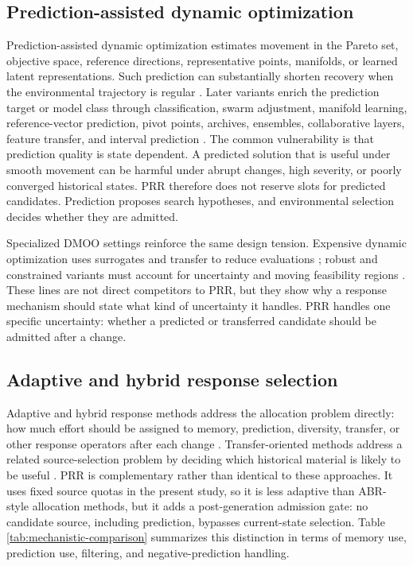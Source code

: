 \documentclass[1p,times]{elsarticle}
\begin{document}
\subsection{Prediction-assisted dynamic optimization}
Prediction-assisted dynamic optimization estimates movement in the Pareto set, objective space, reference directions, representative points, manifolds, or learned latent representations. Such prediction can substantially shorten recovery when the environmental trajectory is regular \cite{zhou2014,grey2020,objective2021,hybrid2022mutation}. Later variants enrich the prediction target or model class through classification, swarm adjustment, manifold learning, reference-vector prediction, pivot points, archives, ensembles, collaborative layers, feature transfer, and interval prediction \cite{classification2022,particle2022pspas,manifold2023mcp,zheng2023rvcp,pivot2023hppds,wang2024dmpa,ensemble2024,hu2025dlcp,ruan2026feature,ou2026hcips}. The common vulnerability is that prediction quality is state dependent. A predicted solution that is useful under smooth movement can be harmful under abrupt changes, high severity, or poorly converged historical states. PRR therefore does not reserve slots for predicted candidates. Prediction proposes search hypotheses, and environmental selection decides whether they are admitted.

Specialized DMOO settings reinforce the same design tension. Expensive dynamic optimization uses surrogates and transfer to reduce evaluations \cite{expensive2022kriging,expensive2025knee}; robust and constrained variants must account for uncertainty and moving feasibility regions \cite{robust2025pstl,constrained2023dvc,asoc2024acrm,constrained2026dualpred,fgsp2025}. These lines are not direct competitors to PRR, but they show why a response mechanism should state what kind of uncertainty it handles. PRR handles one specific uncertainty: whether a predicted or transferred candidate should be admitted after a change.

\subsection{Adaptive and hybrid response selection}
Adaptive and hybrid response methods address the allocation problem directly: how much effort should be assigned to memory, prediction, diversity, transfer, or other response operators after each change \cite{arms2022,peng2024ab,rsas2024}. Transfer-oriented methods address a related source-selection problem by deciding which historical material is likely to be useful \cite{mstl2022,domain2022,wu2023kt,li2024nitl,song2024mst,osbitp2025}. PRR is complementary rather than identical to these approaches. It uses fixed source quotas in the present study, so it is less adaptive than ABR-style allocation methods, but it adds a post-generation admission gate: no candidate source, including prediction, bypasses current-state selection. Table \ref{tab:mechanistic-comparison} summarizes this distinction in terms of memory use, prediction use, filtering, and negative-prediction handling.
\end{document}
